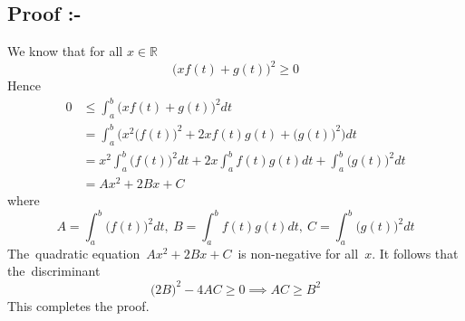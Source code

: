 \documentclass[12pt]{article}
\begin{document}
\pagebreak 


\subsection{Proof :-}


\Large{We know that for all $x\in\mathbb{R}$\[ \Big(xf (t)+g (t)\Big)^2\geq 0\] Hence
\begin{align*}
0 & \leq \int_a^b \Big(xf (t)+g (t)\Big)^2 dt\\[2mm]
& = \int_a^b \Big(x^2\big(f (t)\big)^2+2xf (t)g (t)+\big(g (t)\big)^2\Big) dt\\[2mm]
& = x^2 \int_a^b\big(f (t)\big)^2 dt+ 2x\int_a^bf (t)g (t)dt + \int_a^b\big(g (t)\big)^2dt\\[2mm]
& = Ax^2+2Bx+C
\end{align*}where \[A=\int_a^b\big(f (t)\big)^2 dt,\ B=\int_a^bf (t)g (t)dt,\  C=\int_a^b\big(g (t)\big)^2dt\]The quadratic equation $Ax^2+2Bx+C$ is non-negative for all $x$. It follows that the discriminant $$\big(2B\big)^2-4AC\geq 0\implies AC\geq B^2$$This completes the proof.

}
\end{document}
